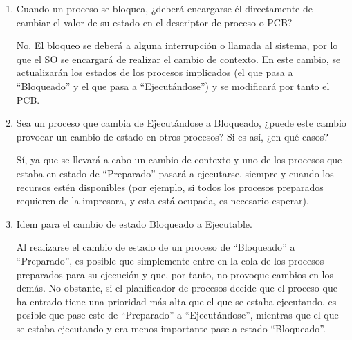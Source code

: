\begin{ejercicio}
\begin{enumerate}
        \item Cuando un proceso se bloquea, ¿deberá encargarse él directamente de cambiar el valor de su estado en el descriptor de proceso o PCB?
        
        No. El bloqueo se deberá a alguna interrupción o llamada al sistema, por lo que el SO se encargará de realizar el cambio de contexto. En este cambio, se actualizarán los estados de los procesos implicados (el que pasa a ``Bloqueado'' y el que pasa a ``Ejecutándose'') y se modificará por tanto el PCB.
        

        \item Sea un proceso que cambia de Ejecutándose a Bloqueado, ¿puede este cambio provocar un cambio de estado en otros procesos? Si es así, ¿en qué casos?
        
        Sí, ya que se llevará a cabo un cambio de contexto y uno de los procesos que estaba en estado de ``Preparado'' pasará a ejecutarse, siempre y cuando los recursos estén disponibles (por ejemplo, si todos los procesos preparados requieren de la impresora, y esta está ocupada, es necesario esperar).
        
        \item Idem para el cambio de estado Bloqueado a Ejecutable.

        Al realizarse el cambio de estado de un proceso de ``Bloqueado'' a ``Preparado'', es posible que simplemente entre en la cola de los procesos preparados para su ejecución y que, por tanto, no provoque cambios en los demás. No obstante, si el planificador de procesos decide que el proceso que ha entrado tiene una prioridad más alta que el que se estaba ejecutando, es posible que pase este de ``Preparado'' a ``Ejecutándose'', mientras que el que se estaba ejecutando y era menos importante pase a estado ``Bloqueado''.
    \end{enumerate}
\end{ejercicio}

